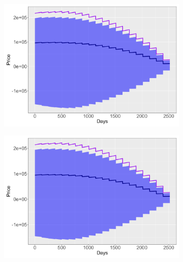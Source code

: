 \begin{figure}[!htbp]
    \centering
    \captionsetup{type=figure}
    \begin{subfigure}{0.49\textwidth}
        \centering
        \captionsetup{justification=centering}
        \includegraphics[width=\textwidth]{Figures/Exposure/procedure_1_poly_model_exposure_plot.png}
        \label{fig:exposure of procedure 1, poly.}
    \end{subfigure}
    \hfill
    \begin{subfigure}{0.49\textwidth}
        \centering
        \captionsetup{justification=centering}
        \includegraphics[width=\textwidth]{Figures/Exposure/procedure_1_spline_model_exposure_plot.png}
        \label{fig:exposure of procedure 1, spline.}

\end{subfigure}
\end{figure}
